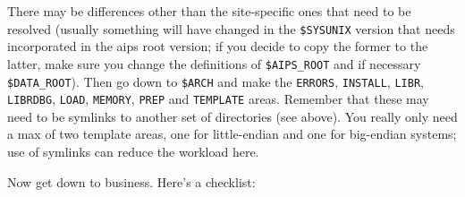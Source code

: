 \medskip

There may be differences other than the site-specific ones that need to
be resolved (usually something will have changed in the {\tt\$SYSUNIX}
version that needs incorporated in the aips root version; if you decide
to copy the former to the latter, make sure you change the definitions
of {\tt\$AIPS\_ROOT} and if necessary {\tt\$DATA\_ROOT}).  Then go down
to {\tt \$ARCH} and make the {\tt ERRORS}, {\tt INSTALL}, {\tt LIBR},
{\tt LIBRDBG}, {\tt LOAD}, {\tt MEMORY}, {\tt PREP} and {\tt TEMPLATE}
areas.  Remember that these may need to be symlinks to another set of
directories (see above).  You really only need a max of two template
areas, one for little-endian and one for big-endian systems; use of
symlinks can reduce the workload here.

\noindent Now get down to business.  Here's a checklist:\medskip

